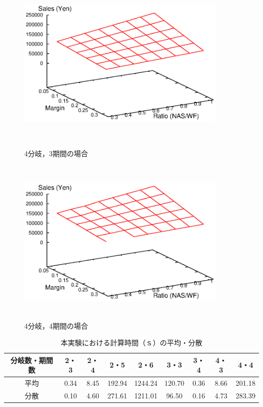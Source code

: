 \documentclass[a4paper,12pt,showkeys]{jreport}
\begin{document}
\begin{figure}[]
 \begin{minipage}{0.5\hsize}
  \begin{center}
   \includegraphics[width=10cm,height=8cm, clip]{stdout_C4_T3_data_m.eps}
  \end{center}
  \caption{4分岐，3期間の場合}
  \label{fig:C4_T3}
 \end{minipage}
 \begin{minipage}{0.5\hsize}
  \begin{center}
   \includegraphics[width=10cm,height=8cm, clip]{stdout_C4_T4_data_m.eps}
  \end{center}
  \caption{4分岐，4期間の場合}
  \label{fig:C4_T4}
 \end{minipage}
\end{figure}

\newpage
\begin{table}[]
\begin{center}
  \caption{本実験における計算時間（ｓ）の平均・分散}
  \label{tb:2}
  \begin{tabular}{|c|c|c|c|c|c|c|c|c|}
  \hline
  分岐数・期間数 & 2・3 & 2・4 & 2・5 & 2・6 & 3・3 & 3・4 & 4・3 & 4・4 \\
  \hline
  平均 & 0.34 & 8.45 & 192.94 & 1244.24 & 120.70 & 0.36 & 8.66 & 201.18 \\
  \hline
  分散 & 0.10 & 4.60 & 271.61 & 1211.01 & 96.50 & 0.16 & 4.73 & 283.39 \\
  \hline
  \end{tabular}
\end{center}
\end{table}
\end{document}

